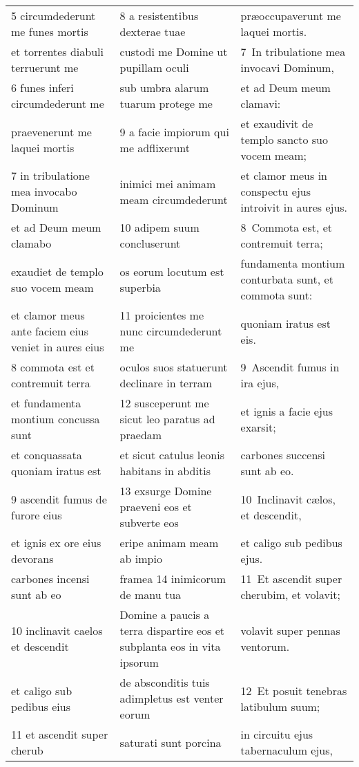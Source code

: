 \documentclass{article}
\begin{document}
\begin{longtable}{@{}p{}p{}p{}@{}}
5 circumdederunt me funes mortis	&	8 a resistentibus dexterae tuae	&	præoccupaverunt me laquei mortis.	\\
et torrentes diabuli terruerunt me	&	custodi me Domine ut pupillam oculi	&	7 In tribulatione mea invocavi Dominum,	\\
6 funes inferi circumdederunt me	&	sub umbra alarum tuarum protege me	&	et ad Deum meum clamavi:	\\
praevenerunt me laquei mortis	&	9 a facie impiorum qui me adflixerunt	&	et exaudivit de templo sancto suo vocem meam;	\\
7 in tribulatione mea invocabo Dominum	&	inimici mei animam meam circumdederunt	&	et clamor meus in conspectu ejus introivit in aures ejus.	\\
et ad Deum meum clamabo	&	10 adipem suum concluserunt	&	8 Commota est, et contremuit terra;	\\
exaudiet de templo suo vocem meam	&	os eorum locutum est superbia	&	fundamenta montium conturbata sunt, et commota sunt:	\\
et clamor meus ante faciem eius veniet in aures eius	&	11 proicientes me nunc circumdederunt me	&	quoniam iratus est eis.	\\
8 commota est et contremuit terra	&	oculos suos statuerunt declinare in terram	&	9 Ascendit fumus in ira ejus,	\\
et fundamenta montium concussa sunt	&	12 susceperunt me sicut leo paratus ad praedam	&	et ignis a facie ejus exarsit;	\\
et conquassata quoniam iratus est	&	et sicut catulus leonis habitans in abditis	&	carbones succensi sunt ab eo.	\\
9 ascendit fumus de furore eius	&	13 exsurge Domine praeveni eos et subverte eos	&	10 Inclinavit cælos, et descendit,	\\
et ignis ex ore eius devorans	&	eripe animam meam ab impio	&	et caligo sub pedibus ejus.	\\
carbones incensi sunt ab eo	&	framea 14 inimicorum de manu tua	&	11 Et ascendit super cherubim, et volavit;	\\
10 inclinavit caelos et descendit	&	Domine a paucis a terra dispartire eos et subplanta eos in vita ipsorum	&	volavit super pennas ventorum.	\\
et caligo sub pedibus eius	&	de absconditis tuis adimpletus est venter eorum	&	12 Et posuit tenebras latibulum suum;	\\
11 et ascendit super cherub	&	saturati sunt porcina	&	in circuitu ejus tabernaculum ejus,	\\

\end{longtable}
\end{document}
